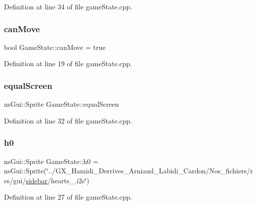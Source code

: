 Definition at line 34 of file game\+State.\+cpp.

\mbox{\label{class_game_state_a4b5b56c5cf57840d8a97dcee5558c8d2}} 
\subsubsection{\texorpdfstring{can\+Move}{canMove}}
{\footnotesize\ttfamily bool Game\+State\+::can\+Move = true}



Definition at line 19 of file game\+State.\+cpp.

\mbox{\label{class_game_state_ae78c31d27bb7a270a3dfd02f9442856e}} 
\subsubsection{\texorpdfstring{equal\+Screen}{equalScreen}}
{\footnotesize\ttfamily ns\+Gui\+::\+Sprite Game\+State\+::equal\+Screen}



Definition at line 32 of file game\+State.\+cpp.

\mbox{\label{class_game_state_a45d1bbc839027176c639951dc38ebed7}} 
\subsubsection{\texorpdfstring{h0}{h0}}
{\footnotesize\ttfamily ns\+Gui\+::\+Sprite Game\+State\+::h0 = ns\+Gui\+::\+Sprite(\char`\"{}../G\+X\+\_\+\+Hamidi\+\_\+\+Derrives\+\_\+\+Arniaud\+\_\+\+Labidi\+\_\+\+Cardon/Nos\+\_\+fichiers/res/gui/\hyperlink{class_game_state_a2e87890f9975c30f4c2bae9d6e05025f}{sidebar}/hearts\+\_.\+i2s\char`\"{})}



Definition at line 27 of file game\+State.\+cpp.

\mbox{\label{class_game_state_a326841cf1da976633653008aef2a04bc}} 

